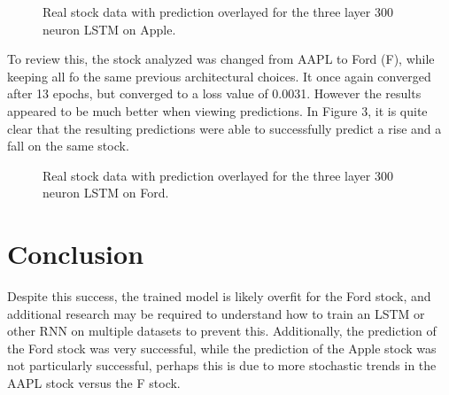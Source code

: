 \documentclass{article}
\begin{document}
    \begin{figure}
        \centering
        \caption{Real stock data with prediction overlayed for the three layer 300 neuron LSTM on Apple.}
    \end{figure}

    To review this, the stock analyzed was changed from AAPL to Ford (F), while keeping all fo the same previous architectural
    choices. It once again converged after 13 epochs, but converged to a loss value of 0.0031. However the results appeared to 
    be much better when viewing predictions. In Figure 3, it is quite clear that the resulting predictions were 
    able to successfully predict a rise and a fall on the same stock. 

    

    \begin{figure}
        \centering
        \caption{Real stock data with prediction overlayed for the three layer 300 neuron LSTM on Ford.}
    \end{figure}

\section{Conclusion}
    Despite this success, the trained model is likely overfit for the Ford stock, and additional research may be required to understand
    how to train an LSTM or other RNN on multiple datasets to prevent this. Additionally, the prediction of the Ford stock was
    very successful, while the prediction of the Apple stock was not particularly successful, perhaps this is due to more
    stochastic trends in the AAPL stock versus the F stock. 
    
\end{document}
